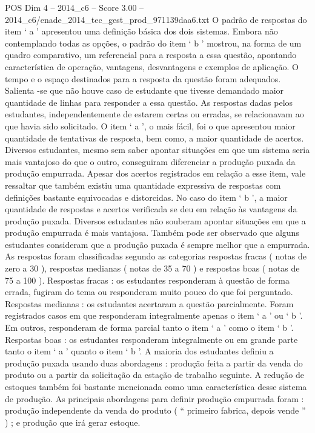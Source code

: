 \begin{textsample}{POS Dim 4 – 2014\_c6 – Score 3.00 – 2014\_c6/enade\_2014\_tec\_gest\_prod\_971139daa6.txt}
O padrão de respostas do item ‘ a ’ apresentou uma definição básica dos dois sistemas.
Embora não contemplando todas as opções, o padrão do item ‘ b ’ mostrou, na forma de um quadro comparativo, um referencial para a resposta a essa questão, apontando característica de operação, vantagens, desvantagens e exemplos de aplicação.
O tempo e o espaço destinados para a resposta da questão foram adequados.
Salienta -se que não houve caso de estudante que tivesse demandado maior quantidade de linhas para responder a essa questão.
As respostas dadas pelos estudantes, independentemente de estarem certas ou erradas, se relacionavam ao que havia sido solicitado.
O item ‘ a ’, o mais fácil, foi o que apresentou maior quantidade de tentativas de resposta, bem como, a maior quantidade de acertos.
Diversos estudantes, mesmo sem saber apontar situações em que um sistema seria mais vantajoso do que o outro, conseguiram diferenciar a produção puxada da produção empurrada.
Apesar dos acertos registrados em relação a esse item, vale ressaltar que também existiu uma quantidade expressiva de respostas com definições bastante equivocadas e distorcidas.
No caso do item ‘ b ’, a maior quantidade de respostas e acertos verificada se deu em relação às vantagens da produção puxada.
Diversos estudantes não souberam apontar situações em que a produção empurrada é mais vantajosa.
Também pode ser observado que alguns estudantes consideram que a produção puxada é sempre melhor que a empurrada.
As respostas foram classificadas segundo as categorias respostas fracas ( notas de zero a 30 ), respostas medianas ( notas de 35 a 70 ) e respostas boas ( notas de 75 a 100 ).
Respostas fracas : os estudantes responderam à questão de forma errada, fugiram do tema ou responderam muito pouco do que foi perguntado.
Respostas medianas : os estudantes acertaram a questão parcialmente.
Foram registrados casos em que responderam integralmente apenas o item ‘ a ’ ou ‘ b ’.
Em outros, responderam de forma parcial tanto o item ‘ a ’ como o item ‘ b ’.
Respostas boas : os estudantes responderam integralmente ou em grande parte tanto o item ‘ a ’ quanto o item ‘ b ’.
A maioria dos estudantes definiu a produção puxada usando duas abordagens : produção feita a partir da venda do produto ou a partir da solicitação da estação de trabalho seguinte.
A redução de estoques também foi bastante mencionada como uma característica desse sistema de produção.
As principais abordagens para definir produção empurrada foram : produção independente da venda do produto ( “ primeiro fabrica, depois vende ” ) ; e produção que irá gerar estoque.

\end{textsample}
